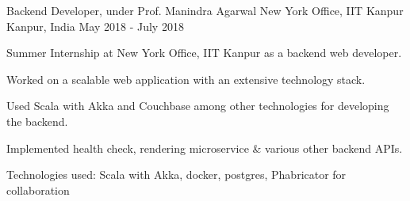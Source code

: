 \begin{cventries}

  \cventry
  {Backend Developer, under Prof. Manindra Agarwal}
  {New York Office, IIT Kanpur}
  {Kanpur, India}
  {May 2018 - July 2018}
  {
    \begin{cvitems}
      \item Summer Internship at New York Office, IIT Kanpur as a backend web developer.
      \item Worked on a scalable web application with an extensive technology stack.
      \item Used Scala with Akka and Couchbase among other technologies for
        developing the backend.
      \item	Implemented health check, rendering microservice \& various other backend APIs.
      \item Technologies used: Scala with Akka, docker, postgres, Phabricator for collaboration
    \end{cvitems}
  }

\end{cventries}
